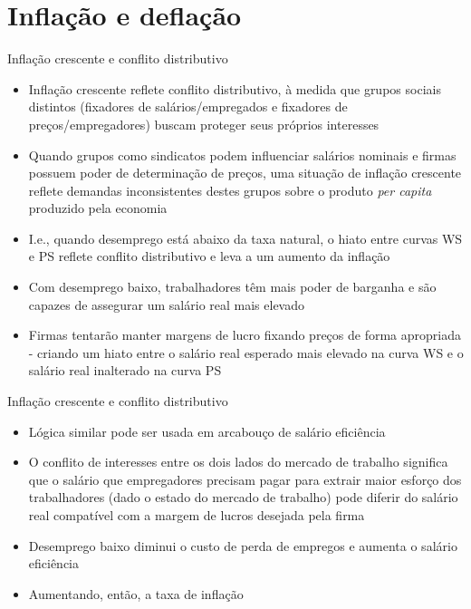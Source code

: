 \documentclass[10pt]{beamer}
\begin{document}
\section{Inflação e deflação}
\begin{frame}
    {Inflação crescente e conflito distributivo}
    \begin{itemize}
        \item Inflação crescente reflete conflito distributivo, à medida que grupos sociais distintos (fixadores de salários/empregados e fixadores de preços/empregadores) buscam proteger seus próprios interesses\bigskip
        \item Quando grupos como sindicatos podem influenciar salários nominais e firmas possuem poder de determinação de preços, uma situação de inflação crescente reflete demandas inconsistentes destes grupos sobre o produto \emph{per capita} produzido pela economia\bigskip
        \item I.e., quando desemprego está abaixo da taxa natural, o hiato entre curvas WS e PS reflete conflito distributivo e leva a um aumento da inflação\bigskip
        \item Com desemprego baixo, trabalhadores têm mais poder de barganha e são capazes de assegurar um salário real mais elevado\bigskip
        \item Firmas tentarão manter margens de lucro fixando preços de forma apropriada - criando um hiato entre o salário real esperado mais elevado na curva WS e o salário real inalterado na curva PS
    \end{itemize}
\end{frame}

\begin{frame}
    {Inflação crescente e conflito distributivo}
    \begin{itemize}
        \item Lógica similar pode ser usada em arcabouço de salário eficiência\bigskip
        \item O conflito de interesses entre os dois lados do mercado de trabalho significa que o salário que empregadores precisam pagar para extrair maior esforço dos trabalhadores (dado o estado do mercado de trabalho) pode diferir do salário real compatível com a margem de lucros desejada pela firma\bigskip
        \item Desemprego baixo diminui o custo de perda de empregos e aumenta o salário eficiência\bigskip
        \item Aumentando, então, a taxa de inflação
    \end{itemize}
\end{frame}
\end{document}
